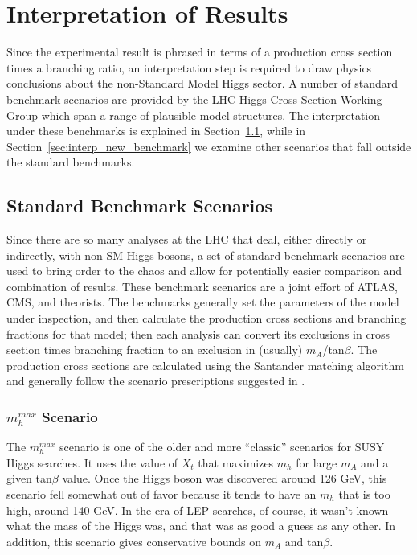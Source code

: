 

\chapter[Interpretation]{Interpretation of Results}

Since the experimental result is phrased in terms of a production cross section
times a branching ratio, an interpretation step is required to draw physics conclusions
about the non-Standard Model Higgs sector. A number of standard benchmark scenarios
are provided by the LHC Higgs Cross Section Working Group \cite{mssm_xsec_wg} which span 
a range of plausible model structures.  The interpretation under these benchmarks
is explained in Section~\ref{sec:interp_benchmark}, while in Section~\ref{sec:interp_new_benchmark} we examine other scenarios
that fall outside the standard benchmarks.

\section{Standard Benchmark Scenarios}
\label{sec:interp_benchmark}
Since there are so many analyses at the LHC that deal, either directly or indirectly,
with non-SM Higgs bosons, a set of standard benchmark scenarios are used to bring
order to the chaos and allow for potentially easier comparison and combination 
of results.  These benchmark scenarios are a joint effort of ATLAS, CMS, and 
theorists.  The benchmarks generally set the parameters of the model under inspection,
and then calculate the production cross sections and branching fractions for that
model; then each analysis can convert its exclusions in cross section times 
branching fraction to an exclusion in (usually) $m_A$/tan$\beta$.  The production
cross sections are calculated using the Santander matching algorithm \cite{santander} 
and generally follow the scenario prescriptions suggested in \cite{Carena-2}.

\subsection{$m_h^{max}$ Scenario}
The $m_h^{max}$ scenario is one of the older and more ``classic'' scenarios for 
SUSY Higgs searches.  It uses the value of $X_t$ that maximizes
$m_h$ for large $m_A$ and a given tan$\beta$ value.  Once the Higgs boson was discovered
around 126 GeV, this scenario fell somewhat out of favor because it tends to have an $m_h$ that
is too high, around 140 GeV.  In the era of LEP searches, of course, it wasn't known
what the mass of the Higgs was, and that was as good a guess as any other.  In addition,
this scenario gives conservative bounds on $m_A$ and tan$\beta$.


